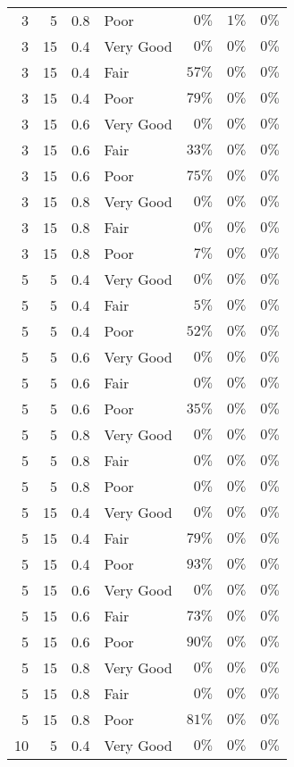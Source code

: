 \begin{longtable}{rrrlrrr}
3 & 5 & 0.8 & Poor & $0\%$ & $1\%$ & $0\%$ \\ 
3 & 15 & 0.4 & Very Good & $0\%$ & $0\%$ & $0\%$ \\ 
3 & 15 & 0.4 & Fair & $57\%$ & $0\%$ & $0\%$ \\ 
3 & 15 & 0.4 & Poor & $79\%$ & $0\%$ & $0\%$ \\ 
3 & 15 & 0.6 & Very Good & $0\%$ & $0\%$ & $0\%$ \\ 
3 & 15 & 0.6 & Fair & $33\%$ & $0\%$ & $0\%$ \\ 
3 & 15 & 0.6 & Poor & $75\%$ & $0\%$ & $0\%$ \\ 
3 & 15 & 0.8 & Very Good & $0\%$ & $0\%$ & $0\%$ \\ 
3 & 15 & 0.8 & Fair & $0\%$ & $0\%$ & $0\%$ \\ 
3 & 15 & 0.8 & Poor & $7\%$ & $0\%$ & $0\%$ \\ 
5 & 5 & 0.4 & Very Good & $0\%$ & $0\%$ & $0\%$ \\ 
5 & 5 & 0.4 & Fair & $5\%$ & $0\%$ & $0\%$ \\ 
5 & 5 & 0.4 & Poor & $52\%$ & $0\%$ & $0\%$ \\ 
5 & 5 & 0.6 & Very Good & $0\%$ & $0\%$ & $0\%$ \\ 
5 & 5 & 0.6 & Fair & $0\%$ & $0\%$ & $0\%$ \\ 
5 & 5 & 0.6 & Poor & $35\%$ & $0\%$ & $0\%$ \\ 
5 & 5 & 0.8 & Very Good & $0\%$ & $0\%$ & $0\%$ \\ 
5 & 5 & 0.8 & Fair & $0\%$ & $0\%$ & $0\%$ \\ 
5 & 5 & 0.8 & Poor & $0\%$ & $0\%$ & $0\%$ \\ 
5 & 15 & 0.4 & Very Good & $0\%$ & $0\%$ & $0\%$ \\ 
5 & 15 & 0.4 & Fair & $79\%$ & $0\%$ & $0\%$ \\ 
5 & 15 & 0.4 & Poor & $93\%$ & $0\%$ & $0\%$ \\ 
5 & 15 & 0.6 & Very Good & $0\%$ & $0\%$ & $0\%$ \\ 
5 & 15 & 0.6 & Fair & $73\%$ & $0\%$ & $0\%$ \\ 
5 & 15 & 0.6 & Poor & $90\%$ & $0\%$ & $0\%$ \\ 
5 & 15 & 0.8 & Very Good & $0\%$ & $0\%$ & $0\%$ \\ 
5 & 15 & 0.8 & Fair & $0\%$ & $0\%$ & $0\%$ \\ 
5 & 15 & 0.8 & Poor & $81\%$ & $0\%$ & $0\%$ \\ 
10 & 5 & 0.4 & Very Good & $0\%$ & $0\%$ & $0\%$ \\ 

\end{longtable}
